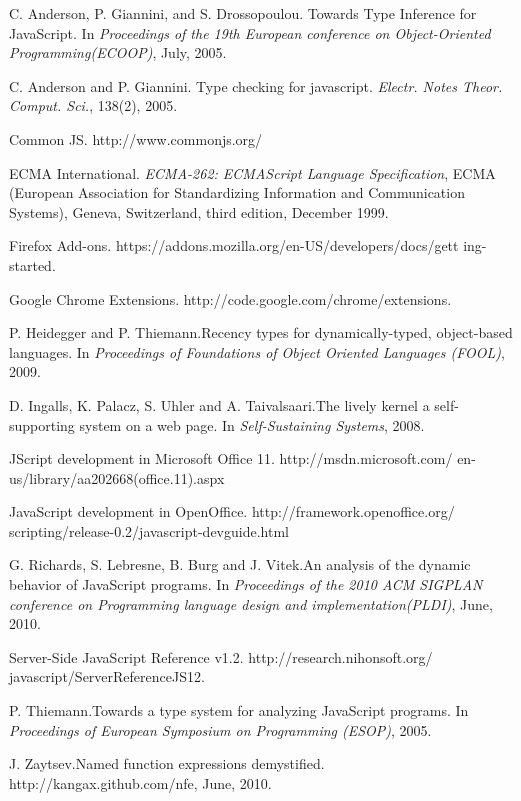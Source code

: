 \documentclass[conference]{IEEEtran}
\begin{document}
\begin{thebibliography}{10}

C. Anderson, P. Giannini, and S. Drossopoulou. \newblock Towards Type Inference for JavaScript.
\newblock In \emph{Proceedings of the 19th European conference on Object-Oriented Programming(ECOOP)},
July, 2005.

C. Anderson and P. Giannini. \newblock Type checking for javascript.
\newblock \emph{Electr. Notes Theor. Comput. Sci.}, 138(2), 2005. 

Common JS.
\newblock http://www.commonjs.org/

ECMA International.
\newblock \emph{ECMA-262: ECMAScript Language Specification},
ECMA (European Association for Standardizing Information
and Communication Systems), Geneva, Switzerland, third edition,
December 1999. 

Firefox Add-ons.
\newblock https://addons.mozilla.org/en-US/developers/docs/gett ing-started.

Google Chrome Extensions.
\newblock http://code.google.com/chrome/extensions.

P. Heidegger and P. Thiemann.\newblock Recency types for dynamically-typed, object-based languages.
\newblock In \emph{Proceedings of Foundations of Object Oriented Languages (FOOL)},
2009.

D. Ingalls, K. Palacz, S. Uhler and A. Taivalsaari.\newblock The lively kernel a self-supporting system on
a web page.
\newblock In \emph{Self-Sustaining Systems},
2008.

JScript development in Microsoft Office 11.
\newblock http://msdn.microsoft.com/ en-us/library/aa202668(office.11).aspx

JavaScript development in OpenOffice.
\newblock http://framework.openoffice.org/ scripting/release-0.2/javascript-devguide.html

G. Richards, S. Lebresne, B. Burg and J. Vitek.\newblock An analysis of the dynamic behavior of JavaScript programs.
\newblock In \emph{Proceedings of the 2010 ACM SIGPLAN conference on Programming language design and implementation(PLDI)},
June, 2010.

Server-Side JavaScript Reference v1.2.
\newblock http://research.nihonsoft.org/ javascript/ServerReferenceJS12.

P. Thiemann.\newblock Towards a type system for analyzing JavaScript programs.
\newblock In \emph{Proceedings of European Symposium on Programming (ESOP)},
2005.

J. Zaytsev.\newblock Named function expressions demystified.
\newblock http://kangax.github.com/nfe,
June, 2010.


\end{thebibliography}


\end{document}
